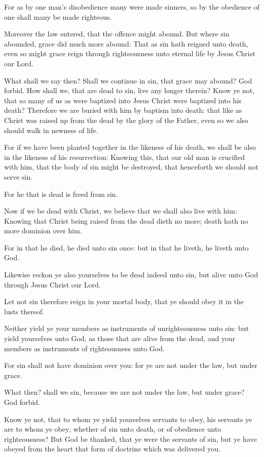 \Verse For as by one man's disobedience many were made sinners, so by the obedience of one shall many be made righteous.

\Verse Moreover the law entered, that the offence might abound. But where sin abounded, grace did much more abound: \Verse That as sin hath reigned unto death, even so might grace reign through righteousness unto eternal life by Jesus Christ our Lord.


\Chapter
\Verse What shall we say then? Shall we continue in sin, that grace may abound?  \Verse God forbid. How shall we, that are dead to sin, live any longer therein?  \Verse Know ye not, that so many of us as were baptized into Jesus Christ were baptized into his death?  \Verse Therefore we are buried with him by baptism into death: that like as Christ was raised up from the dead by the glory of the Father, even so we also should walk in newness of life.

\Verse For if we have been planted together in the likeness of his death, we shall be also in the likeness of his resurrection: \Verse Knowing this, that our old man is crucified with him, that the body of sin might be destroyed, that henceforth we should not serve sin.

\Verse For he that is dead is freed from sin.

\Verse Now if we be dead with Christ, we believe that we shall also live with him: \Verse Knowing that Christ being raised from the dead dieth no more; death hath no more dominion over him.

\Verse For in that he died, he died unto sin once: but in that he liveth, he liveth unto God.

\Verse Likewise reckon ye also yourselves to be dead indeed unto sin, but alive unto God through Jesus Christ our Lord.

\Verse Let not sin therefore reign in your mortal body, that ye should obey it in the lusts thereof.

\Verse Neither yield ye your members as instruments of unrighteousness unto sin: but yield yourselves unto God, as those that are alive from the dead, and your members as instruments of righteousness unto God.

\Verse For sin shall not have dominion over you: for ye are not under the law, but under grace.

\Verse What then? shall we sin, because we are not under the law, but under grace? God forbid.

\Verse Know ye not, that to whom ye yield yourselves servants to obey, his servants ye are to whom ye obey; whether of sin unto death, or of obedience unto righteousness?  \Verse But God be thanked, that ye were the servants of sin, but ye have obeyed from the heart that form of doctrine which was delivered you.

